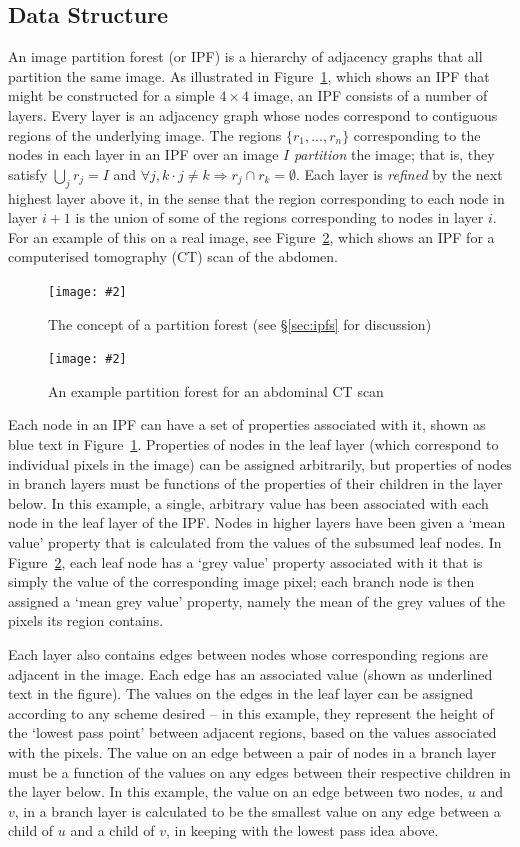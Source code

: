 \documentclass[10pt,twocolumn,twoside]{IEEEtran}
\newcommand{\stufigex}[5]					%
{
	\begin{figure}[#5]
	\begin{center}
		\texttt{[image: \#2]}
		\caption{#3}
		\label{#4}
	\end{center}
	\end{figure}
}
\begin{document}
\subsection{Data Structure}

An image partition forest (or IPF) is a hierarchy of adjacency graphs that all partition the same image. As illustrated in Figure~\ref{fig:ipfs-concept}, which shows an IPF that might be constructed for a simple $4 \times 4$ image, an IPF consists of a number of layers. Every layer is an adjacency graph whose nodes correspond to contiguous regions of the underlying image. The regions $\{r_1,...,r_n\}$ corresponding to the nodes in each layer in an IPF over an image $I$ \emph{partition} the image; that is, they satisfy $\bigcup_j r_j = I$ and $\forall j, k \cdot j \ne k \Rightarrow r_j \cap r_k = \emptyset$. Each layer is \emph{refined} by the next highest layer above it, in the sense that the region corresponding to each node in layer $i + 1$ is the union of some of the regions corresponding to nodes in layer $i$. For an example of this on a real image, see Figure~\ref{fig:ipfs-ctconcept}, which shows an IPF for a computerised tomography (CT) scan of the abdomen.

\stufigex{width=.85\linewidth}{ipfs-concept.png}{The concept of a partition forest (see \S\ref{sec:ipfs} for discussion)}{fig:ipfs-concept}{htb}

\stufigex{width=.85\linewidth}{ipfs-ctconcept.png}{An example partition forest for an abdominal CT scan}{fig:ipfs-ctconcept}{htb}

Each node in an IPF can have a set of properties associated with it, shown as blue text in Figure~\ref{fig:ipfs-concept}. Properties of nodes in the leaf layer (which correspond to individual pixels in the image) can be assigned arbitrarily, but properties of nodes in branch layers must be functions of the properties of their children in the layer below. In this example, a single, arbitrary value has been associated with each node in the leaf layer of the IPF. Nodes in higher layers have been given a `mean value' property that is calculated from the values of the subsumed leaf nodes. In Figure~\ref{fig:ipfs-ctconcept}, each leaf node has a `grey value' property associated with it that is simply the value of the corresponding image pixel; each branch node is then assigned a `mean grey value' property, namely the mean of the grey values of the pixels its region contains.

Each layer also contains edges between nodes whose corresponding regions are adjacent in the image. Each edge has an associated value (shown as underlined text in the figure). The values on the edges in the leaf layer can be assigned according to any scheme desired -- in this example, they represent the height of the `lowest pass point' between adjacent regions, based on the values associated with the pixels. The value on an edge between a pair of nodes in a branch layer must be a function of the values on any edges between their respective children in the layer below. In this example, the value on an edge between two nodes, $u$ and $v$, in a branch layer is calculated to be the smallest value on any edge between a child of $u$ and a child of $v$, in keeping with the lowest pass idea above.
\end{document}
